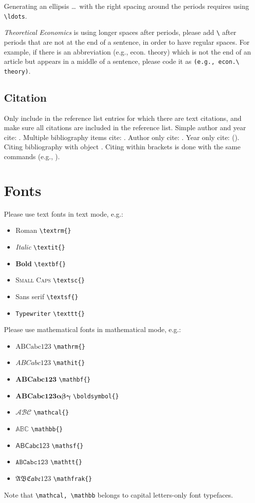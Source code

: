 \documentclass[qe,nameyear,draft]{econsocart}
\theoremstyle{plain}
\theoremstyle{remark}
\begin{document}
Generating an ellipsis \ldots\ with the right spacing
around the periods requires using \verb|\ldots|.

\textit{Theoretical Economics} is using longer spaces after periods, please add \verb|\| after periods that are not at the end of a sentence, in order to have regular spaces. For example, if there is an abbreviation (e.g., econ. theory) which is not the end of an article but appears in a middle of a sentence, please code it as \verb|(e.g., econ.\ theory)|. 

\subsection{Citation}
Only include in the reference list entries for which there are text citations,
and make sure all citations are included in the reference list.
Simple author and year cite: \citet{b1}. 
Multiple bibliography items cite: \citet{b2,b3,b4,b5}.
Author only cite: \citeauthor{b4}.
Year only cite: (\citeyear{b4}). Citing bibliography with object \citet[Theorem 1]{b1}. Citing within brackets is done with the same commands (e.g., \citet{b2,b3,b4}).

\section{Fonts}
Please use text fonts in text mode, e.g.:
\begin{itemize}
\item[]\textrm{Roman} \verb|\textrm{}|
\item[]\textit{Italic} \verb|\textit{}|
\item[]\textbf{Bold} \verb|\textbf{}|
\item[]\textsc{Small Caps} \verb|\textsc{}|
\item[]\textsf{Sans serif} \verb|\textsf{}|
\item[]\texttt{Typewriter} \verb|\texttt{}|
\end{itemize}
Please use mathematical fonts in mathematical mode, e.g.:
\begin{itemize}
\item[] $\mathrm{ABCabc123}$ \verb|\mathrm{}|
\item[] $\mathit{ABCabc123}$ \verb|\mathit{}|
\item[] $\mathbf{ABCabc123}$ \verb|\mathbf{}|
\item[] $\boldsymbol{ABCabc123\alpha\beta\gamma}$ \verb|\boldsymbol{}|
\item[] $\mathcal{ABC}$ \verb|\mathcal{}|
\item[] $\mathbb{ABC}$ \verb|\mathbb{}|
\item[] $\mathsf{ABCabc123}$ \verb|\mathsf{}| 
\item[] $\mathtt{ABCabc123}$ \verb|\mathtt{}|
\item[] $\mathfrak{ABCabc123}$ \verb|\mathfrak{}|
\end{itemize}
Note that \verb|\mathcal, \mathbb| belongs to capital letters-only font typefaces.
\end{document}
